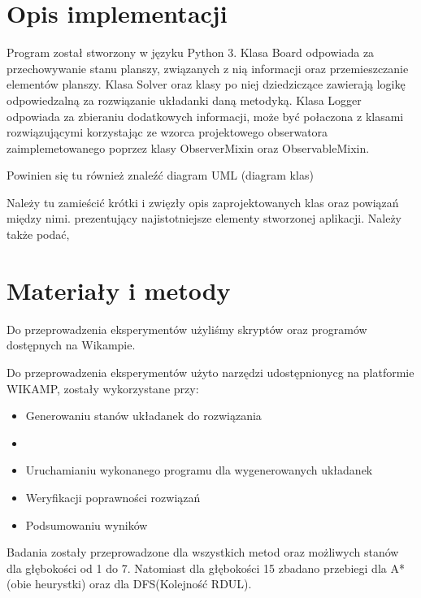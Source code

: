 \documentclass{classrep}
\begin{document}
    \section{Opis implementacji}
    {\color{blue}
    Program został stworzony w języku Python 3.
    Klasa Board odpowiada za przechowywanie stanu planszy, związanych z nią informacji oraz
    przemieszczanie elementów planszy.
    Klasa Solver oraz klasy po niej dziedziczące zawierają logikę odpowiedzalną za rozwiązanie układanki daną metodyką.
    Klasa Logger odpowiada za zbieraniu dodatkowych informacji, może być połaczona z klasami rozwiązującymi
    korzystając ze wzorca projektowego obserwatora zaimplemetowanego poprzez klasy ObserverMixin oraz ObservableMixin.

    Powinien się tu również znaleźć diagram UML (diagram klas)


    Należy tu zamieścić krótki i zwięzły opis zaprojektowanych klas oraz powiązań
    między nimi.
        prezentujący najistotniejsze elementy stworzonej aplikacji. Należy także podać,




    }

    \section{Materiały i metody}
    {\color{blue}
        Do przeprowadzenia eksperymentów użyliśmy skryptów oraz programów dostępnych na Wikampie.

    Do przeprowadzenia eksperymentów użyto narzędzi udostępnionycg na platformie WIKAMP,
    zostały wykorzystane przy:
       \begin{itemize}
            \item Generowaniu stanów układanek do rozwiązania
            \item \item Uruchamianiu wykonanego programu dla wygenerowanych układanek
          \item Weryfikacji poprawności rozwiązań
           \item Podsumowaniu wyników
     \end{itemize}
    Badania zostały przeprowadzone dla wszystkich metod oraz możliwych stanów dla
    głębokości od 1 do 7. Natomiast dla głębokości 15 zbadano przebiegi dla A*(obie heurystki)
    oraz dla DFS(Kolejność RDUL).
    }
\end{document}
